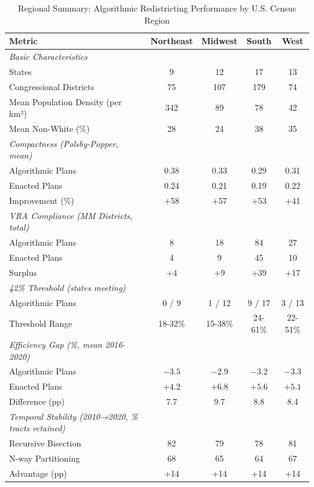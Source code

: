 
\begin{table}[htbp]
\centering
\caption{Regional Summary: Algorithmic Redistricting Performance by U.S. Census Region}
\label{tab:regional-summary}
\small
\begin{tabular}{lcccc}
\toprule
\textbf{Metric} & \textbf{Northeast} & \textbf{Midwest} & \textbf{South} & \textbf{West} \\
\midrule
\textit{Basic Characteristics} & & & & \\
States & 9 & 12 & 17 & 13 \\
Congressional Districts & 75 & 107 & 179 & 74 \\
Mean Population Density (per km²) & 342 & 89 & 78 & 42 \\
Mean Non-White (\%) & 28 & 24 & 38 & 35 \\
\midrule
\textit{Compactness (Polsby-Popper, mean)} & & & & \\
Algorithmic Plans & 0.38 & 0.33 & 0.29 & 0.31 \\
Enacted Plans & 0.24 & 0.21 & 0.19 & 0.22 \\
Improvement (\%) & +58 & +57 & +53 & +41 \\
\midrule
\textit{VRA Compliance (MM Districts, total)} & & & & \\
Algorithmic Plans & 8 & 18 & 84 & 27 \\
Enacted Plans & 4 & 9 & 45 & 10 \\
Surplus & +4 & +9 & +39 & +17 \\
\midrule
\textit{42\% Threshold (states meeting)} & & & & \\
Algorithmic Plans & 0 / 9 & 1 / 12 & 9 / 17 & 3 / 13 \\
Threshold Range & 18-32\% & 15-38\% & 24-61\% & 22-51\% \\
\midrule
\textit{Efficiency Gap (\%, mean 2016-2020)} & & & & \\
Algorithmic Plans & $-3.5$ & $-2.9$ & $-3.2$ & $-3.3$ \\
Enacted Plans & $+4.2$ & $+6.8$ & $+5.6$ & $+5.1$ \\
Difference (pp) & 7.7 & 9.7 & 8.8 & 8.4 \\
\midrule
\textit{Temporal Stability (2010→2020, \% tracts retained)} & & & & \\
Recursive Bisection & 82 & 79 & 78 & 81 \\
N-way Partitioning & 68 & 65 & 64 & 67 \\
Advantage (pp) & +14 & +14 & +14 & +14 \\
\bottomrule
\end{tabular}
\vspace{0.5em}


\end{table}
